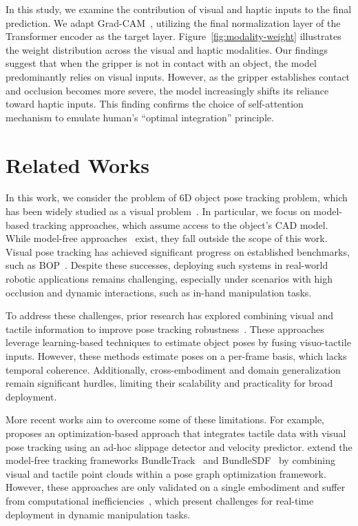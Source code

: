 \documentclass[11pt, a4paper, logo, twocolumn]{brown}
\begin{document}
In this study, we examine the contribution of visual and haptic inputs to the final prediction.
We adapt Grad-CAM~\cite{selvaraju_grad-cam_2020}, utilizing the final normalization layer of the Transformer encoder as the target layer.
Figure~\ref{fig:modality-weight} illustrates the weight distribution across the visual and haptic modalities. 
Our findings suggest that when the gripper is not in contact with an object, the model predominantly relies on visual inputs. 
However, as the gripper establishes contact and occlusion becomes more severe, the model increasingly shifts its reliance toward haptic inputs.
This finding confirms the choice of self-attention mechanism to emulate human's ``optimal integration'' principle.

\section{Related Works} 
In this work, we consider the problem of 6D object pose tracking problem, which has been widely studied as a visual problem~\cite{wen_se3-tracknet_2020, li_deepim_2018, wen_foundationpose_2024, deng_poserbpf_2021}.
In particular, we focus on model-based tracking approaches, which assume access to the object's CAD model. 
While model-free approaches~\cite{wen_bundletrack_2021, wen_bundlesdf_2023, suresh_neuralfeels_2024} exist, they fall outside the scope of this work.
Visual pose tracking has achieved significant progress on established benchmarks, such as BOP~\cite{hodan_bop_2024}.
Despite these successes, deploying such systems in real-world robotic applications remains challenging, especially under scenarios with high occlusion and dynamic interactions, such as in-hand manipulation tasks.

To address these challenges, prior research has explored combining visual and tactile information to improve pose tracking robustness~\cite{li_vihope_2023, suresh_neuralfeels_2024, dikhale_visuotactile_2022, wan_vint-6d_2024, rezazadeh_hierarchical_2023, tu_posefusion_2023, gao_-hand_2023, li_hypertaxel_2024}.
These approaches leverage learning-based techniques to estimate object poses by fusing visuo-tactile inputs. 
However, these methods estimate poses on a per-frame basis, which lacks temporal coherence. 
Additionally, cross-embodiment and domain generalization remain significant hurdles, limiting their scalability and practicality for broad deployment.

More recent works aim to overcome some of these limitations. 
For example, \citet{liu_enhancing_2024} proposes an optimization-based approach that integrates tactile data with visual pose tracking using an ad-hoc slippage detector and velocity predictor. 
\citet{suresh_neuralfeels_2024} extend the model-free tracking frameworks BundleTrack~\cite{wen_bundletrack_2021} and BundleSDF~\cite{wen_bundlesdf_2023} by combining visual and tactile point clouds within a pose graph optimization framework. 
However, these approaches are only validated on a single embodiment and suffer from computational inefficiencies~\cite{suresh_neuralfeels_2024}, which present challenges for real-time deployment in dynamic manipulation tasks.
\end{document}
